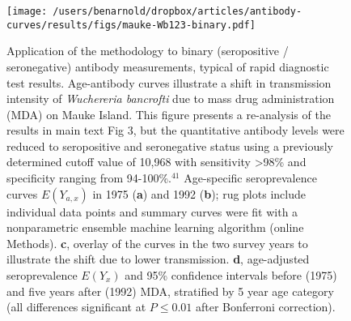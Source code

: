 \documentclass[11pt]{article}
\begin{document}
\clearpage
\begin{figure}[htbp]
\begin{center}
\texttt{[image: /users/benarnold/dropbox/articles/antibody-curves/results/figs/mauke-Wb123-binary.pdf]}
\begin{minipage}{\textwidth}
\caption{Application of the methodology to binary (seropositive / seronegative) antibody measurements, typical of rapid diagnostic test results. Age-antibody curves illustrate a shift in transmission intensity of \textit{Wuchereria bancrofti} due to mass drug administration (MDA) on Mauke Island.  This figure presents a re-analysis of the results in main text Fig 3, but the quantitative antibody levels were reduced to seropositive and seronegative status using a previously determined cutoff value of 10,968 with sensitivity >98\% and specificity ranging from 94-100\%.$^{41}$ Age-specific seroprevalence curves $E(Y_{a,x})$ in 1975 (\textbf{a}) and 1992 (\textbf{b}); rug plots include individual data points and summary curves were fit with a nonparametric ensemble machine learning algorithm (online Methods). \textbf{c}, overlay of the curves in the two survey years to illustrate the shift due to lower transmission.  \textbf{d}, age-adjusted seroprevalence $E(Y_{x})$ and 95\% confidence intervals before (1975) and five years after (1992) MDA, stratified by 5 year age category (all differences significant at $P\leq0.01$ after Bonferroni correction).}
\label{fig:maukebina}
\end{minipage}
\end{center}
\end{figure}
\end{document}
